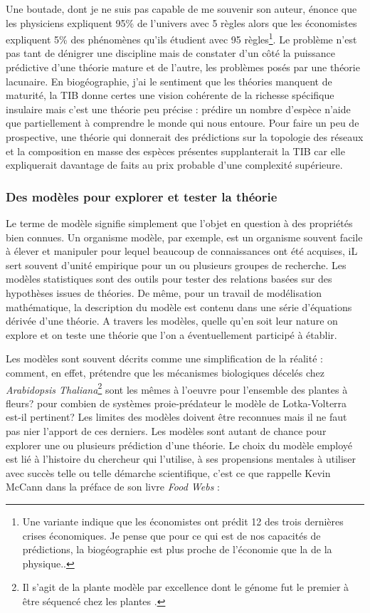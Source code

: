 Une boutade, dont je ne suis pas capable de me souvenir son auteur,
énonce que les physiciens expliquent 95\% de l'univers avec 5 règles
alors que les économistes expliquent 5\% des phénomènes qu'ils étudient
avec 95 règles\footnote{Une variante indique que les économistes ont
  prédit 12 des trois dernières crises économiques. Je pense que pour ce
  qui est de nos capacités de prédictions, la biogéographie est plus
  proche de l'économie que la de la physique..}. Le problème n'est pas
tant de dénigrer une discipline mais de constater d'un côté la puissance
prédictive d'une théorie mature et de l'autre, les problèmes posés par
une théorie lacunaire. En biogéographie, j'ai le sentiment que les
théories manquent de maturité, la TIB donne certes une vision cohérente
de la richesse spécifique insulaire mais c'est une théorie peu précise :
prédire un nombre d'espèce n'aide que partiellement à comprendre le
monde qui nous entoure. Pour faire un peu de prospective, une théorie
qui donnerait des prédictions sur la topologie des réseaux et la
composition en masse des espèces présentes supplanterait la TIB car elle
expliquerait davantage de faits au prix probable d'une complexité
supérieure.

\subsubsection*{Des modèles pour explorer et tester la
théorie}\label{des-moduxe8les-pour-explorer-et-tester-la-thuxe9orie}

Le terme de modèle signifie simplement que l'objet en question à des
propriétés bien connues. Un organisme modèle, par exemple, est un
organisme souvent facile à élever et manipuler pour lequel beaucoup de
connaissances ont été acquises, iL sert souvent d'unité empirique pour
un ou plusieurs groupes de recherche. Les modèles statistiques sont des
outils pour tester des relations basées sur des hypothèses issues de
théories. De même, pour un travail de modélisation mathématique, la
description du modèle est contenu dans une série d'équations dérivée
d'une théorie. A travers les modèles, quelle qu'en soit leur nature on
explore et on teste une théorie que l'on a éventuellement participé à
établir.

Les modèles sont souvent décrits comme une simplification de la réalité
: comment, en effet, prétendre que les mécanismes biologiques décelés
chez \emph{Arabidopsis Thaliana}\footnote{Il s'agit de la plante modèle
  par excellence dont le génome fut le premier à être séquencé chez les
  plantes \citep{TheArabidopsisGenomeInitiative2000}.} sont les mêmes à
l'oeuvre pour l'ensemble des plantes à fleurs? pour combien de systèmes
proie-prédateur le modèle de Lotka-Volterra est-il pertinent? Les
limites des modèles doivent être reconnues mais il ne faut pas nier
l'apport de ces derniers. Les modèles sont autant de chance pour
explorer une ou plusieurs prédiction d'une théorie. Le choix du modèle
employé est lié à l'histoire du chercheur qui l'utilise, à ses
propensions mentales à utiliser avec succès telle ou telle démarche
scientifique, c'est ce que rappelle Kevin McCann dans la préface de son
livre \emph{Food Webs} \citep{mccann2011food}:

